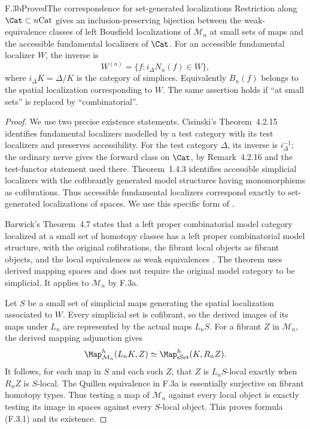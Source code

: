 \begin{claim}{F.3b}{Proved}{The correspondence for set-generated localizations}
Restriction along $\Cat\subset n\mathrm{Cat}$ gives an
inclusion-preserving bijection between the weak-equivalence classes
of left Bousfield localizations of $\mathcal M_n$ at small sets of
maps and the accessible fundamental localizers of $\Cat$.
For an accessible fundamental localizer $W$, the inverse is
\[
 W^{(n)}=\{f:i_\Delta N_n(f)\in W\},                 \tag{F.3.1}
\]
where $i_\Delta K=\Delta/K$ is the category of simplices.
Equivalently $B_n(f)$ belongs to the spatial localization
corresponding to $W$. The same assertion holds if ``at small sets''
is replaced by ``combinatorial''.
\end{claim}
\begin{proof}
We use two precise existence statements. Cisinski's
Theorem~4.2.15 identifies fundamental localizers modelled by a test
category with its test localizers and preserves accessibility.
For the test category $\Delta$, its inverse is $i_\Delta^{-1}$;
the ordinary nerve gives the forward class on $\Cat$, by
Remark~4.2.16 and the test-functor statement used there.
Theorem~1.4.3 identifies accessible simplicial localizers with the
cofibrantly generated model structures having monomorphisms as
cofibrations. Thus accessible fundamental localizers correspond
exactly to set-generated localizations of spaces. We use this
specific form of \cite{I_Cisinski2006}.

Barwick's Theorem~4.7 states that a left proper combinatorial model
category localized at a small set of homotopy classes has a left
proper combinatorial model structure, with the original
cofibrations, the fibrant local objects as fibrant objects, and the
local equivalences as weak equivalences \cite{I_Barwick2010}.
The theorem uses derived mapping spaces and does not require the
original model category to be simplicial. It applies to $\mathcal M_n$
by F.3a.

Let $S$ be a small set of simplicial maps generating the spatial
localization associated to $W$. Every simplicial set is cofibrant,
so the derived images of its maps under $L_n$ are represented by
the actual maps $L_nS$. For a fibrant $Z$ in $\mathcal M_n$,
the derived mapping adjunction gives
\[
 \Map^h_{\mathcal M_n}(L_nK,Z)
       \simeq\Map^h_{\sSet}(K,R_nZ).
\]
It follows, for each map in $S$ and each such $Z$, that $Z$ is
$L_nS$-local exactly when $R_nZ$ is $S$-local. The Quillen
equivalence in F.3a is essentially surjective on fibrant homotopy
types. Thus testing a map of $\mathcal M_n$ against every local
object is exactly testing its image in spaces against every
$S$-local object. This proves formula (F.3.1) and its existence.


\end{proof}
